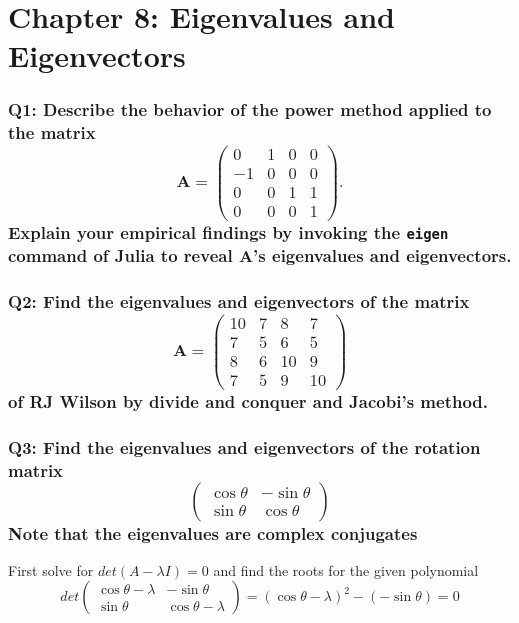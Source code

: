 \documentclass{article}
\begin{document}
\newpage
\section*{Chapter 8: Eigenvalues and Eigenvectors}

\subsubsection*{Q1: Describe the behavior of the power method applied to the matrix
\[ 
\mathbf{A} = 
\begin{pmatrix}
0 & 1 & 0 & 0 \\
-1 & 0 & 0 & 0 \\
0 & 0 & 1 & 1 \\
0 & 0 & 0 & 1 
\end{pmatrix}. 
\]
Explain your empirical findings by invoking the \texttt{eigen} command of Julia to reveal \(\mathbf{A}\)'s eigenvalues and eigenvectors.}

\subsubsection*{Q2: Find the eigenvalues and eigenvectors of the matrix
\[
\mathbf{A} = 
\begin{pmatrix}
10 & 7 & 8 & 7 \\
7 & 5 & 6 & 5 \\
8 & 6 & 10 & 9 \\
7 & 5 & 9 & 10 
\end{pmatrix}
\]
of RJ Wilson by divide and conquer and Jacobi’s method.}

\subsubsection*{Q3: Find the eigenvalues and eigenvectors of the rotation matrix
$$
\begin{pmatrix}
\cos \theta & -\sin \theta \\
\sin \theta & \cos \theta
\end{pmatrix}
$$
Note that the eigenvalues are complex conjugates}

First solve for $det(A- \lambda I) = 0$ and find the roots for the given polynomial
$$
det \begin{pmatrix}
\cos \theta - \lambda & -\sin \theta \\
\sin \theta & \cos \theta - \lambda
\end{pmatrix} = (\cos \theta - \lambda)^{2} - (-\sin \theta) = 0 
$$
\end{document}
